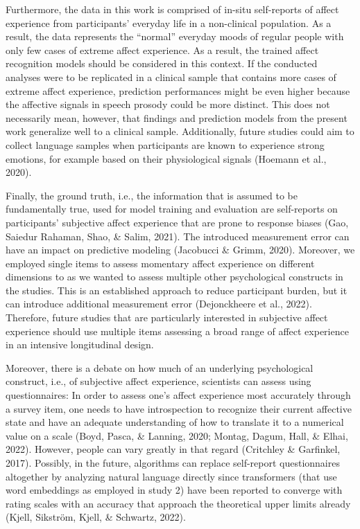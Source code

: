 \documentclass[
  english,
  man,floatsintext]{apa6}
\begin{document}
Furthermore, the data in this work is comprised of in-situ self-reports of affect experience from participants' everyday life in a non-clinical population. As a result, the data represents the ``normal'' everyday moods of regular people with only few cases of extreme affect experience. As a result, the trained affect recognition models should be considered in this context. If the conducted analyses were to be replicated in a clinical sample that contains more cases of extreme affect experience, prediction performances might be even higher because the affective signals in speech prosody could be more distinct. This does not necessarily mean, however, that findings and prediction models from the present work generalize well to a clinical sample. Additionally, future studies could aim to collect language samples when participants are known to experience strong emotions, for example based on their physiological signals (Hoemann et al., 2020).

Finally, the ground truth, i.e., the information that is assumed to be fundamentally true, used for model training and evaluation are self-reports on participants' subjective affect experience that are prone to response biases (Gao, Saiedur Rahaman, Shao, \& Salim, 2021). The introduced measurement error can have an impact on predictive modeling (Jacobucci \& Grimm, 2020). Moreover, we employed single items to assess momentary affect experience on different dimensions to as we wanted to assess multiple other psychological constructs in the studies. This is an established approach to reduce participant burden, but it can introduce additional measurement error (Dejonckheere et al., 2022). Therefore, future studies that are particularly interested in subjective affect experience should use multiple items assessing a broad range of affect experience in an intensive longitudinal design.

Moreover, there is a debate on how much of an underlying psychological construct, i.e., of subjective affect experience, scientists can assess using questionnaires: In order to assess one's affect experience most accurately through a survey item, one needs to have introspection to recognize their current affective state and have an adequate understanding of how to translate it to a numerical value on a scale (Boyd, Pasca, \& Lanning, 2020; Montag, Dagum, Hall, \& Elhai, 2022). However, people can vary greatly in that regard (Critchley \& Garfinkel, 2017). Possibly, in the future, algorithms can replace self-report questionnaires altogether by analyzing natural language directly since transformers (that use word embeddings as employed in study 2) have been reported to converge with rating scales with an accuracy that approach the theoretical upper limits already (Kjell, Sikström, Kjell, \& Schwartz, 2022).
\end{document}
